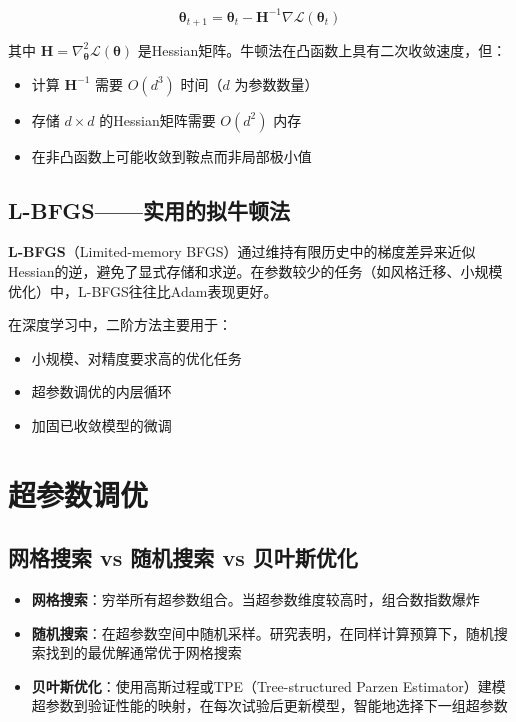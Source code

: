 \[
\boldsymbol{\theta}_{t+1} = \boldsymbol{\theta}_t - \mathbf{H}^{-1}\nabla\mathcal{L}(\boldsymbol{\theta}_t)
\]

其中 $\mathbf{H} = \nabla_{\boldsymbol{\theta}}^2\mathcal{L}(\boldsymbol{\theta})$ 是Hessian矩阵。牛顿法在凸函数上具有二次收敛速度，但：
\begin{itemize}
    \item 计算 $\mathbf{H}^{-1}$ 需要 $O(d^3)$ 时间（$d$ 为参数数量）
    \item 存储 $d \times d$ 的Hessian矩阵需要 $O(d^2)$ 内存
    \item 在非凸函数上可能收敛到鞍点而非局部极小值
\end{itemize}

\subsection{L-BFGS——实用的拟牛顿法}

\textbf{L-BFGS}（Limited-memory BFGS）通过维持有限历史中的梯度差异来近似Hessian的逆，避免了显式存储和求逆。在参数较少的任务（如风格迁移、小规模优化）中，L-BFGS往往比Adam表现更好。

在深度学习中，二阶方法主要用于：
\begin{itemize}
    \item 小规模、对精度要求高的优化任务
    \item 超参数调优的内层循环
    \item 加固已收敛模型的微调
\end{itemize}

\section{超参数调优}

\subsection{网格搜索 vs 随机搜索 vs 贝叶斯优化}

\begin{itemize}
    \item \textbf{网格搜索}：穷举所有超参数组合。当超参数维度较高时，组合数指数爆炸
    \item \textbf{随机搜索}：在超参数空间中随机采样。研究表明，在同样计算预算下，随机搜索找到的最优解通常优于网格搜索
    \item \textbf{贝叶斯优化}：使用高斯过程或TPE（Tree-structured Parzen Estimator）建模超参数到验证性能的映射，在每次试验后更新模型，智能地选择下一组超参数
\end{itemize}

